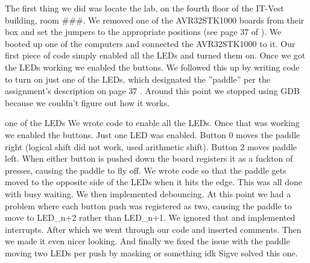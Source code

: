The first thing we did was locate the lab, on the fourth floor of the IT-Vest building, room ###. 
We removed one of the AVR32STK1000 boards from their box and set the jumpers to the appropriate positions (see page 37 of \cite{lab-compendium}).
We booted up one of the computers and connected the AVR32STK1000 to it. 
Our first piece of code simply enabled all the LEDs and turned them on. Once we got the LEDs working we enabled the buttons. We followed this up by writing code to turn on just one of the LEDs, which designated the ''paddle'' per the assignment's description on page 37 \cite{lab-compendium}. Around this point we stopped using GDB because we couldn't figure out how it works.

one of the LEDs
We wrote code to enable all the LEDs.
Once that was working we enabled the buttons.
Just one LED was enabled.
Button 0 moves the paddle right (logical shift did not work, used arithmetic shift).
Button 2 moves paddle left.
When either button is pushed down the board registers it as a fuckton of presses, causing the paddle to fly off.
We wrote code so that the paddle gets moved to the opposite side of the LEDs when it hits the edge.
This was all done with busy waiting.
We then implemented debouncing.
At this point we had a problem where each button push was registered as two, causing the paddle to move to LED_{n+2} rather than LED_{n+1}.
We ignored that and implemented interrupts.
After which we went through our code and inserted comments.
Then we made it even nicer looking.
And finally we fixed the issue with the paddle moving two LEDs per push by masking or something idk Sigve solved this one.